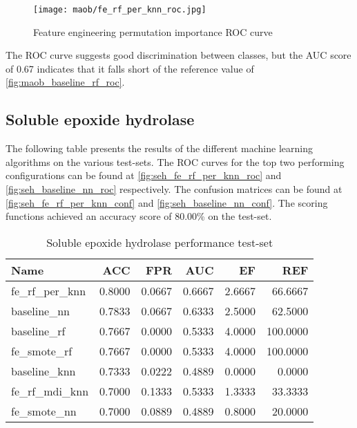 \begin{figure}[H]
    \begin{center}
        \caption[]{Feature engineering permutation importance ROC curve}
        \label{fig:maob_fe_rf_per_knn_roc}
        \texttt{[image: maob/fe\_rf\_per\_knn\_roc.jpg]}
    \end{center}
\end{figure}
The ROC curve suggests good discrimination between classes, but the AUC score of 0.67 indicates that it falls short of the reference value of \ref*{fig:maob_baseline_rf_roc}.
\subsection{Soluble epoxide hydrolase}
The following table presents the results of the different machine learning algorithms on the various
test-sets. The ROC curves for the top two performing configurations can be found at \ref{fig:seh_fe_rf_per_knn_roc} and \ref{fig:seh_baseline_nn_roc}
respectively. The confusion matrices can be found at \ref{fig:seh_fe_rf_per_knn_conf} and \ref{fig:seh_baseline_nn_conf}.
The scoring functions achieved an accuracy score of 80.00\% on the test-set.

\begin{table}[H]
    \begin{center}
        \caption{Soluble epoxide hydrolase performance test-set}
        \begin{tabular}{lrrrrr}
            \toprule
            Name             & ACC    & FPR    & AUC    & EF     & REF      \\
            \midrule
            fe\_rf\_per\_knn & 0.8000 & 0.0667 & 0.6667 & 2.6667 & 66.6667  \\
            baseline\_nn     & 0.7833 & 0.0667 & 0.6333 & 2.5000 & 62.5000  \\
            baseline\_rf     & 0.7667 & 0.0000 & 0.5333 & 4.0000 & 100.0000 \\
            fe\_smote\_rf    & 0.7667 & 0.0000 & 0.5333 & 4.0000 & 100.0000 \\
            baseline\_knn    & 0.7333 & 0.0222 & 0.4889 & 0.0000 & 0.0000   \\
            fe\_rf\_mdi\_knn & 0.7000 & 0.1333 & 0.5333 & 1.3333 & 33.3333  \\
            fe\_smote\_nn    & 0.7000 & 0.0889 & 0.4889 & 0.8000 & 20.0000  \\
            \bottomrule
        \end{tabular}
    \end{center}
\end{table}

